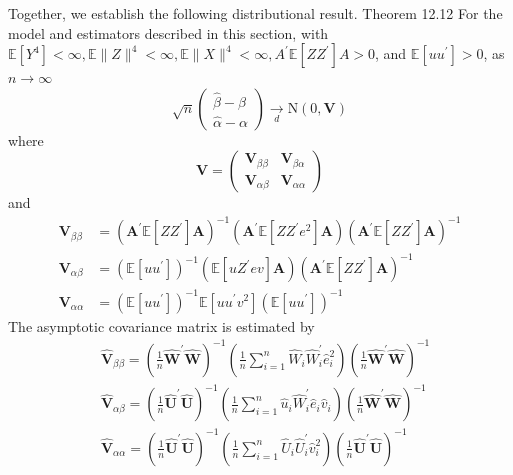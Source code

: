 \documentclass[10pt]{article}
\begin{document}
Together, we establish the following distributional result. Theorem 12.12 For the model and estimators described in this section, with $\mathbb{E}\left[Y^{4}\right]<\infty, \mathbb{E}\|Z\|^{4}<\infty, \mathbb{E}\|X\|^{4}<\infty, A^{\prime} \mathbb{E}\left[Z Z^{\prime}\right] A>0$, and $\mathbb{E}\left[u u^{\prime}\right]>0$, as $n \rightarrow \infty$
$$
\sqrt{n}\left(\begin{array}{c}
\widehat{\beta}-\beta \\
\widehat{\alpha}-\alpha
\end{array}\right) \underset{d}{\longrightarrow} \mathrm{N}(0, \boldsymbol{V})
$$
where
$$
\boldsymbol{V}=\left(\begin{array}{ll}
\boldsymbol{V}_{\beta \beta} & \boldsymbol{V}_{\beta \alpha} \\
\boldsymbol{V}_{\alpha \beta} & \boldsymbol{V}_{\alpha \alpha}
\end{array}\right)
$$
and
$$
\begin{aligned}
\boldsymbol{V}_{\beta \beta} &=\left(\boldsymbol{A}^{\prime} \mathbb{E}\left[Z Z^{\prime}\right] \boldsymbol{A}\right)^{-1}\left(\boldsymbol{A}^{\prime} \mathbb{E}\left[Z Z^{\prime} e^{2}\right] \boldsymbol{A}\right)\left(\boldsymbol{A}^{\prime} \mathbb{E}\left[Z Z^{\prime}\right] \boldsymbol{A}\right)^{-1} \\
\boldsymbol{V}_{\alpha \beta} &=\left(\mathbb{E}\left[u u^{\prime}\right]\right)^{-1}\left(\mathbb{E}\left[u Z^{\prime} e v\right] \boldsymbol{A}\right)\left(\boldsymbol{A}^{\prime} \mathbb{E}\left[Z Z^{\prime}\right] \boldsymbol{A}\right)^{-1} \\
\boldsymbol{V}_{\alpha \alpha} &=\left(\mathbb{E}\left[u u^{\prime}\right]\right)^{-1} \mathbb{E}\left[u u^{\prime} v^{2}\right]\left(\mathbb{E}\left[u u^{\prime}\right]\right)^{-1}
\end{aligned}
$$
The asymptotic covariance matrix is estimated by
$$
\begin{aligned}
&\widehat{\boldsymbol{V}}_{\beta \beta}=\left(\frac{1}{n} \widehat{\boldsymbol{W}}^{\prime} \widehat{\boldsymbol{W}}\right)^{-1}\left(\frac{1}{n} \sum_{i=1}^{n} \widehat{W}_{i} \widehat{W}_{i}^{\prime} \widehat{e}_{i}^{2}\right)\left(\frac{1}{n} \widehat{\boldsymbol{W}}^{\prime} \widehat{\boldsymbol{W}}\right)^{-1} \\
&\widehat{\boldsymbol{V}}_{\alpha \beta}=\left(\frac{1}{n} \widehat{\boldsymbol{U}}^{\prime} \widehat{\boldsymbol{U}}\right)^{-1}\left(\frac{1}{n} \sum_{i=1}^{n} \widehat{u}_{i} \widehat{W}_{i}^{\prime} \widehat{e}_{i} \widehat{v}_{i}\right)\left(\frac{1}{n} \widehat{\boldsymbol{W}}^{\prime} \widehat{\boldsymbol{W}}\right)^{-1} \\
&\widehat{\boldsymbol{V}}_{\alpha \alpha}=\left(\frac{1}{n} \widehat{\boldsymbol{U}}^{\prime} \widehat{\boldsymbol{U}}\right)^{-1}\left(\frac{1}{n} \sum_{i=1}^{n} \widehat{U}_{i} \widehat{U}_{i}^{\prime} \widehat{v}_{i}^{2}\right)\left(\frac{1}{n} \widehat{\boldsymbol{U}}^{\prime} \widehat{\boldsymbol{U}}\right)^{-1}
\end{aligned}
$$
\end{document}
